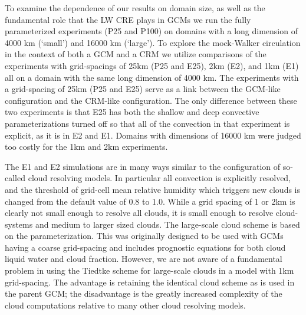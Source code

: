 \documentclass[draft]{agujournal2019}
\begin{document}
To examine the dependence of our results on domain size, as well as the fundamental role that the LW CRE plays in GCMs
we run the fully parameterized experiments (P25 and P100) on domains with a long dimension of 4000 km (`small') and 16000 km (`large').  
To explore the mock-Walker circulation in the context of both a GCM and a CRM we utilize 
comparisons of the experiments with grid-spacings of 25km (P25 and E25), 2km (E2), and 1km (E1) all on a domain with the same long dimension 
of 4000 km.  The experiments with a grid-spacing of 25km (P25 and E25) serve as a link between the GCM-like configuration and the CRM-like 
configuration.  The only difference between these two experiments is that E25 has both the shallow and deep convective parameterizations turned 
off so that all of the convection in that experiment is explicit, as it is in E2 and E1.  Domains with dimensions of 16000 km were judged too 
costly for the 1km and 2km experiments.  

The E1 and E2 simulations are in many ways similar to the configuration of so-called cloud resolving models.  
In particular all convection is explicitly resolved, %
and the threshold of grid-cell mean relative humidity which triggers new clouds is changed from the default value of 0.8 to 1.0.  
While a grid spacing of 1 or 2km is clearly not small enough
to resolve all clouds, it is small enough to resolve cloud-systems and medium to larger sized clouds.  
The large-scale cloud scheme is based on the  parameterization.  
This was originally designed to be used with GCMs having a coarse grid-spacing and includes prognostic equations for both 
cloud liquid water and cloud fraction.  
However, we are not aware of a fundamental problem in using the Tiedtke scheme for large-scale clouds in a model with 1km grid-spacing.   
The advantage is retaining the identical cloud scheme as is used in the parent GCM; the disadvantage is the greatly increased complexity of the 
cloud computations relative to many other cloud resolving models.    
\end{document}
